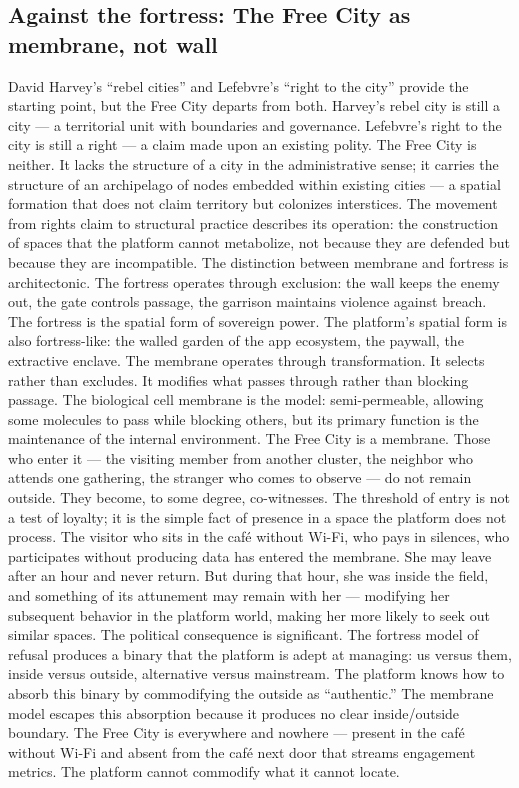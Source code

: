 \subsection{Against the fortress: The Free City as membrane, not wall}

David Harvey’s “rebel cities” and Lefebvre’s “right to the city” provide the starting point, but the Free City departs from both. Harvey’s rebel city is still a city — a territorial unit with boundaries and governance. Lefebvre’s right to the city is still a right — a claim made upon an existing polity. The Free City is neither. It lacks the structure of a city in the administrative sense; it carries the structure of an archipelago of nodes embedded within existing cities — a spatial formation that does not claim territory but colonizes interstices. The movement from rights claim to structural practice describes its operation: the construction of spaces that the platform cannot metabolize, not because they are defended but because they are incompatible. The distinction between membrane and fortress is architectonic. The fortress operates through exclusion: the wall keeps the enemy out, the gate controls passage, the garrison maintains violence against breach. The fortress is the spatial form of sovereign power. The platform’s spatial form is also fortress-like: the walled garden of the app ecosystem, the paywall, the extractive enclave. The membrane operates through transformation. It selects rather than excludes. It modifies what passes through rather than blocking passage. The biological cell membrane is the model: semi-permeable, allowing some molecules to pass while blocking others, but its primary function is the maintenance of the internal environment. The Free City is a membrane. Those who enter it — the visiting member from another cluster, the neighbor who attends one gathering, the stranger who comes to observe — do not remain outside. They become, to some degree, co-witnesses. The threshold of entry is not a test of loyalty; it is the simple fact of presence in a space the platform does not process. The visitor who sits in the café without Wi-Fi, who pays in silences, who participates without producing data has entered the membrane. She may leave after an hour and never return. But during that hour, she was inside the field, and something of its attunement may remain with her — modifying her subsequent behavior in the platform world, making her more likely to seek out similar spaces. The political consequence is significant. The fortress model of refusal produces a binary that the platform is adept at managing: us versus them, inside versus outside, alternative versus mainstream. The platform knows how to absorb this binary by commodifying the outside as “authentic.” The membrane model escapes this absorption because it produces no clear inside/outside boundary. The Free City is everywhere and nowhere — present in the café without Wi-Fi and absent from the café next door that streams engagement metrics. The platform cannot commodify what it cannot locate.

